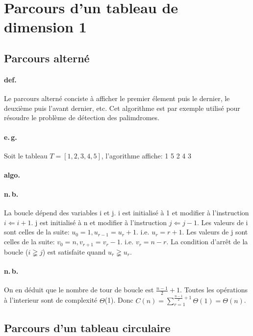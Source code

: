 \documentclass{report}
\begin{document}
  \section{Parcours d'un tableau de dimension 1}

    \subsection{Parcours alterné}

      \paragraph{def.} Le parcours alterné conciste à afficher le premier élement puis le dernier, le deuxième puis l'avant dernier, etc. Cet algorithme est par exemple utilisé pour résoudre le problème de détection des palimdromes.

      \paragraph{e.\,g.} Soit le tableau $T = [1, 2, 3, 4, 5]$, l'agorithme affiche: 1 5 2 4 3

      \paragraph{algo.}

      \paragraph{n.\,b.} La boucle dépend des variables i et j. i est initialisé à 1 et modifier à l'instruction $i \Leftarrow i + 1$. j est initialisé à n et modifier à l'instruction $j \Leftarrow j - 1$. Les valeurs de i sont celles de la suite: $u_{0}=1, u_{r-1}=u_{r} + 1$. i.e. $u_{r}=r+1$. Les valeurs de j sont celles de la suite: $v_{0}=n, v_{r+1}=v_{r} - 1$. i.e. $v_{r}=n-r$. La condition d'arrêt de la boucle ($i \gneqq j$) est satisfaite quand $u_{r} \gneqq u_{r}$.

      \paragraph{n.\,b.} On en déduit que le nombre de tour de boucle est $\frac{n-1}{2} + 1$. Toutes les opérations à l'interieur sont de complexité $\Theta$(1). Donc $C(n) = \sum_{r=1}^{\frac{n-1}{2} + 1} \Theta(1) = \Theta(n)$.

    \subsection{Parcours d'un tableau circulaire}
\end{document}
